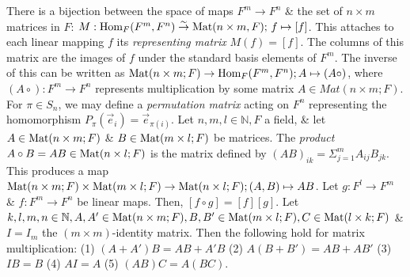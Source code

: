  There is a bijection between the space of maps $F^{m} \to F^{n}$ \& the set of $n \times m$ matrices in $F$: $M : \text{Hom}_{F}(F^{m}, F^{n}) \stackrel{\sim}{\to} \text{Mat}(n \times m, F);\, f \mapsto [f]$. This attaches to each linear mapping $f$ its \emph{representing matrix} $M(f) = [f]$. The columns of this matrix are the images of $f$ under the standard basis elements of $F^{m}$. The inverse of this can be written as $\text{Mat}(n \times m; F) \to \text{Hom}_{F}(F^{m}, F^{n}); A \mapsto (A \circ)$, where $(A \circ) : F^{m} \to F^{n}$ represents multiplication by some matrix $A \in Mat(n \times m; F)$.
 For $\pi \in S_{n}$, we may define a \emph{permutation matrix} acting on $F^n$ representing the homomorphism $P_{\pi}(\vec{e}_{i}) = \vec{e}_{\pi(i)}$.
 Let $n, m, l \in \mathbb{N}, F$ a field, \& let $A \in \text{Mat}(n \times m; F)$ \& $B \in \text{Mat}(m \times l; F)$ be matrices. The \emph{product} $A \circ B = AB \in \text{Mat}(n \times l; F)$ is the matrix defined by $(AB)_{ik} = \Sigma_{j=1}^{m} A_{ij} B_{jk}$. This produces a map $\text{Mat}(n \times m; F) \times \text{Mat}(m \times l; F) \to \text{Mat}(n \times l; F); (A, B) \mapsto AB$.
 Let $g : F^{l} \to F^{m}$ \& $f : F^{m} \to F^{n}$ be linear maps. Then, $[f \circ g] = [f][g]$.
 Let $k,l,m,n \in \mathbb{N}, A, A' \in \text{Mat}(n \times m; F), B, B' \in \text{Mat}(m \times l; F), C \in \text{Mat}(l \times k; F)$ \& $I = I_{m}$ the $(m \times m)$-identity matrix. Then the following hold for matrix multiplication:
(1) $(A + A')B = AB + A'B$
(2) $A(B + B')= AB + AB'$
(3) $IB = B$
(4) $AI = A$
(5) $(AB)C = A(BC)$.
